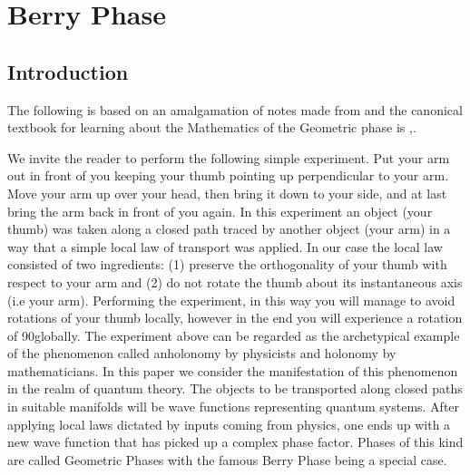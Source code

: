 \section{Berry Phase}
\subsection{Introduction}
The following is based on an amalgamation of notes made from \cite{2005math.ph_geometricphases} and 
the canonical textbook for learning about the Mathematics of the Geometric phase is ,\cite{geometricphases2004}.

We invite the reader to perform the following simple experiment. Put your
arm out in front of you keeping your thumb pointing up perpendicular to your
arm. Move your arm up over your head, then bring it down to your side, and
at last bring the arm back in front of you again. In this experiment an object
(your thumb) was taken along a closed path traced by another object (your
arm) in a way that a simple local law of transport was applied. In our case
the local law consisted of two ingredients: (1) preserve the orthogonality of
your thumb with respect to your arm and (2) do not rotate the thumb about
its instantaneous axis (i.e your arm). Performing the experiment, in this way
you will manage to avoid rotations of your thumb locally, however in the end
you will experience a rotation of 90\textdegree globally.
The experiment above can be regarded as the archetypical example of the
phenomenon called anholonomy by physicists and holonomy by mathematicians.
In this paper we consider the manifestation of this phenomenon in the
realm of quantum theory. The objects to be transported along closed paths
in suitable manifolds will be wave functions representing quantum systems.
After applying local laws dictated by inputs coming from physics, one ends up
with a new wave function that has picked up a complex phase factor. Phases
of this kind are called Geometric Phases with the famous Berry Phase being
a special case.

